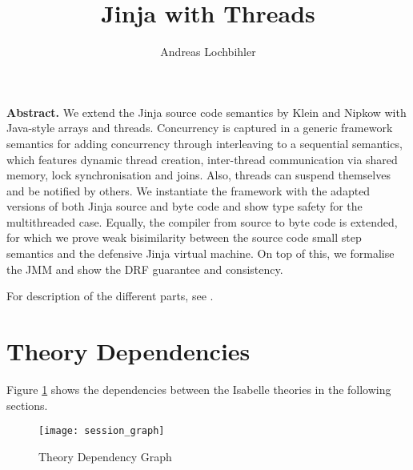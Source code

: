 \documentclass[11pt,a4paper]{book}
\begin{document}
\title{Jinja with Threads}
\author{Andreas Lochbihler}
\maketitle

\begin{trivlist}
\item \textbf{Abstract.}
  We extend the Jinja source code semantics by Klein and Nipkow with Java-style arrays and threads.
  Concurrency is captured in a generic framework semantics for adding concurrency through interleaving to a sequential semantics, which features dynamic thread creation, inter-thread communication via shared memory, lock synchronisation and joins. Also, threads can suspend themselves and be notified by others.
  We instantiate the framework with the adapted versions of both Jinja source and byte code and show type safety for the multithreaded case. 
  Equally, the compiler from source to byte code is extended, for which we prove weak bisimilarity between the source code small step semantics and the defensive Jinja virtual machine.
  On top of this, we formalise the JMM and show the DRF guarantee and consistency.

  For description of the different parts, see \cite{Lochbihler2008FOOL,Lochbihler2010ESOP,LochbihlerBulwahn2011ITP,Lochbihler2012ESOP}.
\end{trivlist}

\tableofcontents

\section{Theory Dependencies}

Figure \ref{theory-deps} shows the dependencies between 
the Isabelle theories in the following sections.

\begin{figure}[h!t]
\begin{center}
  \texttt{[image: session\_graph]}
\end{center}
\caption{Theory Dependency Graph\label{theory-deps}}
\end{figure}

\clearpage





\end{document}
